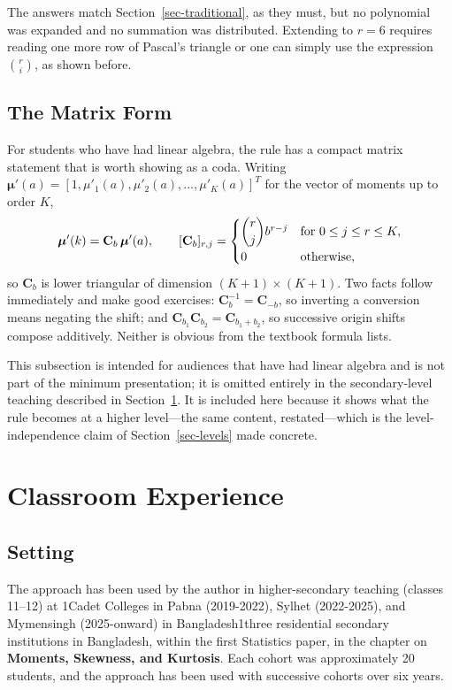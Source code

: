 \documentclass[
  12pt]{article}
\newcommand{\anon}{1}
\begin{document}
The answers match Section~\ref{sec-traditional}, as they must, but no polynomial was expanded and no summation was distributed. Extending to $r = 6$ requires reading one more row of Pascal's triangle or one can simply use the expression $\binom{r}{i}$, as shown before. 

\subsection{The Matrix Form}\label{sec-matrix}

For students who have had linear algebra, the rule has a compact matrix statement that is worth showing as a coda. Writing
$\boldsymbol{\mu}'(a) = \left[1, \mu'_1(a), \mu'_2(a), \dots, \mu'_K(a)\right]^T$
for the vector of moments up to order $K$,
\[
\boldsymbol{\mu}'(k) = \mathbf{C}_b \, \boldsymbol{\mu}'(a),
\qquad
[\mathbf{C}_b]_{r, j} = \begin{cases}
\dbinom{r}{j} b^{r-j} & \text{for } 0 \le j \le r \le K, \\[6pt]
0 & \text{otherwise,}
\end{cases}
\]
so $\mathbf{C}_b$ is lower triangular of dimension $(K+1) \times (K+1)$. Two facts follow immediately and make good exercises: $\mathbf{C}_b^{-1} = \mathbf{C}_{-b}$, so inverting a conversion means negating the shift; and $\mathbf{C}_{b_1}\mathbf{C}_{b_2} = \mathbf{C}_{b_1 + b_2}$, so successive origin shifts compose additively. Neither is obvious from the textbook formula lists.

This subsection is intended for audiences that have had linear algebra and is not part of the minimum presentation; it is omitted entirely in the secondary-level teaching described in Section~\ref{sec-classroom}. It is included here because it shows what the rule becomes at a higher level---the same content, restated---which is the level-independence claim of Section~\ref{sec-levels} made concrete.

\section{Classroom Experience}\label{sec-classroom}

\subsection{Setting}

The approach has been used by the author in higher-secondary teaching (classes 11--12) at \anon Cadet Colleges in Pabna (2019-2022), Sylhet (2022-2025), and Mymensingh (2025-onward) in Bangladesh\fi{}\anon three residential secondary institutions in Bangladesh\fi, within the first Statistics paper, in the chapter on \textbf{Moments, Skewness, and Kurtosis}. Each cohort was approximately 20 students, and the approach has been used with successive cohorts over six years.
\end{document}
